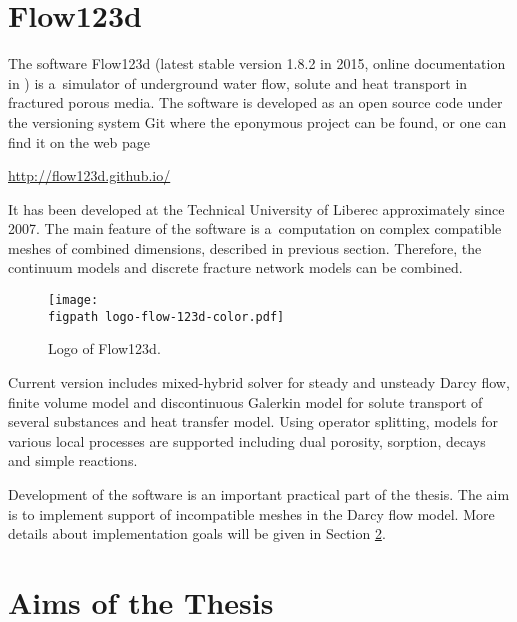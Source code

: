 \documentclass[bibliography=totocnumbered,dvipsnames,FM,Dis]{tulthesis}
\newcommand{\figpath}{figures/}
\begin{document}
\section{Flow123d} \label{sec:soa_flow123d}

The software Flow123d (latest stable version 1.8.2 in 2015, online documentation in \cite{flow123d_doc_2015}) 
is a~simulator of underground water flow, solute and heat transport in fractured porous media. The software is
developed as an open source code under the versioning system Git where the eponymous project can be found, or 
one can find it on the web page
\begin{center}
\url{http://flow123d.github.io/}
\end{center}
It has been developed at the Technical University of Liberec approximately since 2007.
The main feature of the software is a~computation on complex compatible meshes of combined dimensions, described in
previous section. Therefore, the continuum models and discrete fracture network models can be combined.
%
\begin{figure}[!htb]
  \centering
  \texttt{[image: \\figpath logo-flow-123d-color.pdf]}
  \caption{Logo of Flow123d.}
  \label{fig:logo_flow123d}
\end{figure}
%
Current version includes mixed-hybrid solver for steady and unsteady Darcy flow, finite volume model 
and discontinuous Galerkin model for solute transport of several substances and heat transfer model. 
Using operator splitting, models for various local processes are supported including dual porosity, sorption, decays 
and simple reactions.


Development of the software is an important practical part of the thesis. The aim is to implement support 
of incompatible meshes in the Darcy flow model. More details about implementation goals will be given in
Section \ref{chap:aims}.



\section{Aims of the Thesis}\label{chap:aims}
\end{document}
